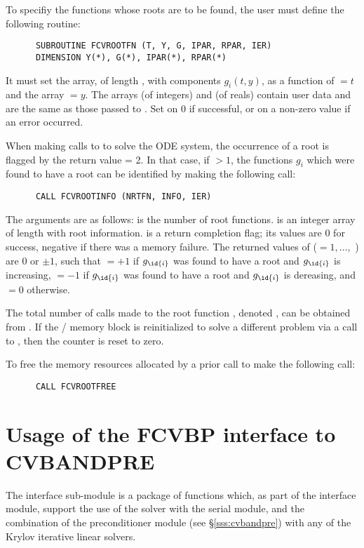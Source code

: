 To specifiy the functions whose roots are to be found, the user must
define the following routine:
\begin{verbatim}
      SUBROUTINE FCVROOTFN (T, Y, G, IPAR, RPAR, IER)
      DIMENSION Y(*), G(*), IPAR(*), RPAR(*)
\end{verbatim}
It must set the  array, of length , with components $g_i(t,y)$,
as a function of  $= t$ and the array  $= y$.  
The arrays  (of integers) and  (of reals) contain user data
and are the same as those passed to .
Set  on 0 if successful, or on a non-zero value if an error occurred.

When making calls to  to solve the ODE system, the occurrence of
a root is flagged by the return value  = 2.  In that case, if
 $> 1$, the functions $g_i$ which were found to have a root can
be identified by making the following call:
\begin{verbatim}
      CALL FCVROOTINFO (NRTFN, INFO, IER)
\end{verbatim}
The arguments are as follows:  is the number of root functions.
 is an integer array of length  with root information.
 is a return completion flag; its values are $0$ for success, 
negative if there was a memory failure.  The returned values of 
($ = 1,\ldots,$ ) are $0$ or $\pm 1$, such that 
 $ = +1$ if $g_{\id{i}}$ was found to have a root and $g_{\id{i}}$ is increasing,
 $ = -1$ if $g_{\id{i}}$ was found to have a root and $g_{\id{i}}$ is dereasing,
and  $ = 0$ otherwise.

The total number of calls made to the root function ,
denoted , can be obtained from .
If the {\fcvode}/{\cvode} memory block is reinitialized to solve a
different problem via a call to , then the counter
 is reset to zero.

To free the memory resources allocated by a prior call to  make
the following call:
\begin{verbatim}
      CALL FCVROOTFREE
\end{verbatim}


\section{Usage of the FCVBP interface to CVBANDPRE}
The {\fcvbp} interface sub-module is a package of {\C} functions which,
as part of the {\fcvode} interface module, support the use of the
{\cvode} solver with the serial {\nvecs} module, and the combination of
the {\cvbandpre} preconditioner module (see \S\ref{sss:cvbandpre}) with
any of the Krylov iterative linear solvers.

